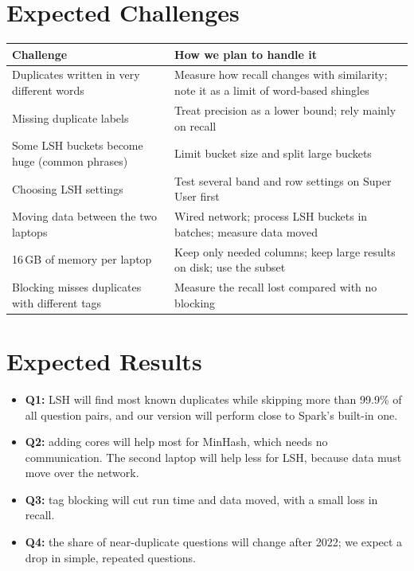 \documentclass[11pt,a4paper]{article}
\begin{document}
\section{Expected Challenges}
{\small
\begin{tabularx}{\textwidth}{@{}p{6.6cm} Y@{}}
\toprule
\textbf{Challenge} & \textbf{How we plan to handle it} \\
\midrule
Duplicates written in very different words & Measure how recall changes with similarity; note it as a limit of word-based shingles \\
Missing duplicate labels & Treat precision as a lower bound; rely mainly on recall \\
Some LSH buckets become huge (common phrases) & Limit bucket size and split large buckets \\
Choosing LSH settings & Test several band and row settings on Super User first \\
Moving data between the two laptops & Wired network; process LSH buckets in batches; measure data moved \\
16\,GB of memory per laptop & Keep only needed columns; keep large results on disk; use the subset \\
Blocking misses duplicates with different tags & Measure the recall lost compared with no blocking \\
\bottomrule
\end{tabularx}}

\section{Expected Results}
\begin{itemize}
  \item \textbf{Q1:} LSH will find most known duplicates while skipping more
        than 99.9\% of all question pairs, and our version will perform close to
        Spark's built-in one.
  \item \textbf{Q2:} adding cores will help most for MinHash, which needs no
        communication. The second laptop will help less for LSH, because data
        must move over the network.
  \item \textbf{Q3:} tag blocking will cut run time and data moved, with a
        small loss in recall.
  \item \textbf{Q4:} the share of near-duplicate questions will change after
        2022; we expect a drop in simple, repeated questions.
\end{itemize}
\end{document}
